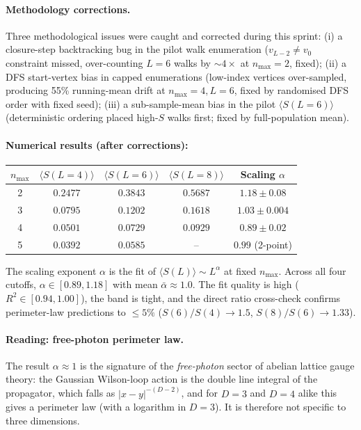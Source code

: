 \documentclass[11pt]{article}
\begin{document}
\paragraph{Methodology corrections.} Three methodological issues were caught
and corrected during this sprint:
(i) a closure-step backtracking bug in the pilot walk enumeration
($v_{L-2}\ne v_0$ constraint missed, over-counting $L=6$ walks by $\sim 4\times$
at $n_\text{max}=2$, fixed);
(ii) a DFS start-vertex bias in capped enumerations
(low-index vertices over-sampled, producing 55\% running-mean drift at
$n_\text{max}=4,L=6$, fixed by randomised DFS order with fixed seed);
(iii) a sub-sample-mean bias in the pilot $\langle S(L=6)\rangle$
(deterministic ordering placed high-$S$ walks first; fixed by full-population
mean).

\paragraph{Numerical results (after corrections):}

\begin{center}
\begin{tabular}{ccccc}
\toprule
$n_\text{max}$ & $\langle S(L=4)\rangle$ & $\langle S(L=6)\rangle$ &
$\langle S(L=8)\rangle$ & Scaling $\alpha$ \\
\midrule
2 & $0.2477$ & $0.3843$ & $0.5687$ & $1.18\pm 0.08$ \\
3 & $0.0795$ & $0.1202$ & $0.1618$ & $1.03\pm 0.004$ \\
4 & $0.0501$ & $0.0729$ & $0.0929$ & $0.89\pm 0.02$ \\
5 & $0.0392$ & $0.0585$ & --       & $0.99$ (2-point) \\
\bottomrule
\end{tabular}
\end{center}

The scaling exponent $\alpha$ is the fit of $\langle S(L)\rangle\sim L^\alpha$
at fixed $n_\text{max}$. Across all four cutoffs, $\alpha\in[0.89,1.18]$ with
mean $\bar\alpha\approx 1.0$. The fit quality is high ($R^2\in[0.94,1.00]$),
the band is tight, and the direct ratio cross-check confirms perimeter-law
predictions to $\le 5\%$ ($S(6)/S(4)\to 1.5$, $S(8)/S(6)\to 1.33$).

\paragraph{Reading: free-photon perimeter law.}

The result $\alpha\approx 1$ is the signature of the \emph{free-photon}
sector of abelian lattice gauge theory: the Gaussian Wilson-loop action is the
double line integral of the propagator, which falls as $|x-y|^{-(D-2)}$, and
for $D = 3$ and $D = 4$ alike this gives a perimeter law (with a logarithm in
$D = 3$).  It is therefore not specific to three dimensions.
\end{document}

